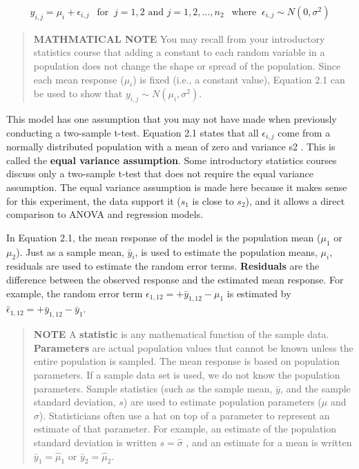 \documentclass[
]{book}
\begin{document}
\begin{align} \label{2.1}
y_{i, j} = \mu_i + \epsilon_{i, j} ~~\text{ for }~ j = 1, 2 \text{ and } j = 1, 2, ... ,n_2 ~~\text{ where }~  \epsilon_{i, j} \sim N(0,\sigma^2)
\tag{2.1}
\end{align}

\begin{quote}
\textbf{MATHMATICAL NOTE}
You may recall from your introductory statistics course that adding a constant to each random variable in a population does not change the shape or spread of the population. Since each mean response (\(\mu_i\)) is fixed (i.e., a constant value), Equation 2.1 can be used to show that \(y_{i, j} \sim N(\mu_i,\sigma^2)\).
\end{quote}

This model has one assumption that you may not have made when previously conducting a two-sample t-test. Equation 2.1 states that all \(\epsilon_{i, j}\) come from a normally distributed population with a mean of zero and
variance s2 . This is called the \textbf{equal variance assumption}. Some introductory statistics courses discuss only a two-sample t-test that does not require the equal variance assumption. The equal variance assumption is
made here because it makes sense for this experiment, the data support it (\(s_1\) is close to \(s_2\)), and it allows a direct comparison to ANOVA and regression models.

In Equation 2.1, the mean response of the model is the population mean (\(\mu_1\) or \(\mu_2\)). Just as a sample mean, \(\bar{y}_i\), is used to estimate the population means, \(\mu_i\), residuals are used to estimate the random error terms. \textbf{Residuals} are the difference between the observed response and the estimated mean response. For example, the random error term \(\epsilon_{1, 12} = + \bar{y}_{1, 12} - \mu_1\) is estimated by \(\hat{\epsilon}_{1, 12} = + \bar{y}_{1, 12} - \bar{y}_1\).

\begin{quote}
\textbf{NOTE}
A \textbf{statistic} is any mathematical function of the sample data. \textbf{Parameters} are actual population values that cannot be known unless the entire population is sampled. The mean response is based on population parameters. If a sample data set is used, we do not know the population parameters. Sample statistics (such as the sample mean, \(\bar{y}\), and the sample standard deviation, \(s\)) are used to estimate population parameters (\(\mu\) and \(\sigma\)). Statisticians often use a hat on top of a parameter to represent an estimate of that parameter. For example, an estimate of the population standard deviation is written \(s = \hat{\sigma}\) , and an estimate for a mean is written \(\bar{y}_1 = \hat{\mu}_1\) or \(\bar{y}_2 = \hat{\mu}_2\).
\end{quote}
\end{document}
